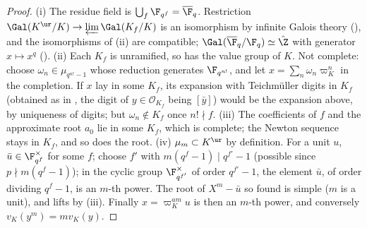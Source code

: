 \begin{proof}
(i) The residue field is $\bigcup_f\F_{q^f}=\overline\F_q$. Restriction $\Gal(K^{\ur}/K)\to\varprojlim\Gal(K_f/K)$ is an isomorphism by infinite Galois theory
(), and the isomorphisms of (ii) are compatible; $\Gal(\overline\F_q/\F_q)\simeq\hat\Z$ with generator
$x\mapsto x^q$ (). (ii) Each $K_f$ is unramified, so has the value group of $K$. Not complete: choose $\omega_n\in\mu_{q^{n!}-1}$ whose
reduction generates $\F_{q^{n!}}$, and let $x=\sum_n\omega_n\varpi_K^n$ in the completion. If $x$ lay in some $K_f$, its expansion with Teichm\"uller digits in
$K_f$ (obtained as in , the digit of $y\in\mathcal O_{K_f}$ being $[\bar y]$) would be the expansion above, by uniqueness of
digits; but $\omega_n\notin K_f$ once $n!\nmid f$. (iii) The coefficients of $f$ and the approximate root $a_0$ lie in some $K_f$, which is
complete; the Newton sequence stays in $K_f$, and so does the root. (iv) $\mu_m\subset K^{\ur}$ by definition. For a unit $u$, $\bar u\in\F_{q^f}^\times$ for
some $f$; choose $f'$ with $m(q^f-1)\mid q^{f'}-1$ (possible since $p\nmid m(q^f-1)$); in the cyclic group $\F_{q^{f'}}^\times$ of order $q^{f'}-1$, the element
$\bar u$, of order dividing $q^f-1$, is an $m$-th power. The root of $X^m-\bar u$ so found is simple ($m$ is a unit), and lifts by (iii). Finally
$x=\varpi_K^{am}u$ is then an $m$-th power, and conversely $v_K(y^m)=mv_K(y)$.
\end{proof}

